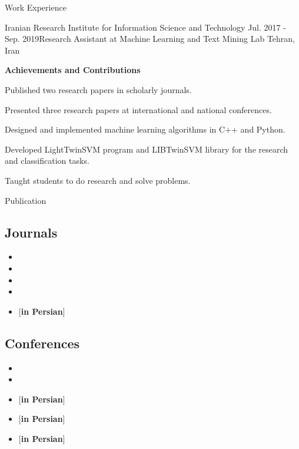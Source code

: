 \documentclass{resume} %
\newcommand{\perspaper}{[\textbf{in Persian}]}
\begin{document}
\begin{rSection}{Work Experience}

\begin{rSubsection}{Iranian Research Institute for Information Science and Technology }{Jul. 2017 - Sep. 2019}{Research Assistant at Machine Learning and Text Mining Lab }{Tehran, Iran}
	
\textbf{Achievements and Contributions}
\item Published two research papers in scholarly journals.
\item Presented three research papers at international and national conferences.
\item Designed and implemented machine learning algorithms in C++ and Python.
\item Developed LightTwinSVM program and LIBTwinSVM library for the research and classification tasks.
\item Taught students to do research and solve problems.
\end{rSubsection}


\end{rSection}

\newpage
\begin{rSection}{Publication}
\subsection*{Journals}
\begin{itemize}
	\item {}
	\item {}
	\item {}
	\item {}
	\item {} \perspaper
\end{itemize}

\subsection*{Conferences}
\begin{itemize}
	\item {}
	\item {}
	\item {} \perspaper
	\item {} \perspaper
	\item {} \perspaper
\end{itemize}	
\end{rSection}
\end{document}
